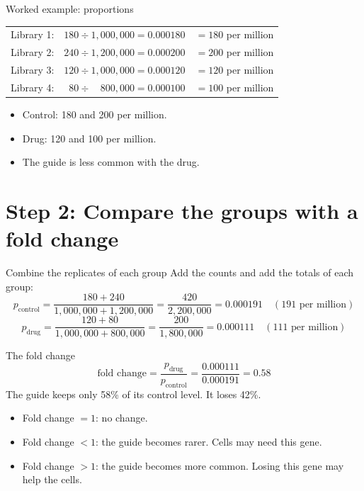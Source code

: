 \documentclass[aspectratio=169,11pt]{beamer}
\begin{document}
\begin{frame}{Worked example: proportions}
\begin{worked}[ 1]
\small
\begin{tabular}{@{}lll@{}}
Library 1: & $180 \div 1{,}000{,}000 = 0.000180$ & $= 180$ per million\\
Library 2: & $240 \div 1{,}200{,}000 = 0.000200$ & $= 200$ per million\\
Library 3: & $120 \div 1{,}000{,}000 = 0.000120$ & $= 120$ per million\\
Library 4: & $\phantom{0}80 \div \phantom{0,}800{,}000 = 0.000100$ & $= 100$ per million\\
\end{tabular}
\end{worked}
\begin{itemize}
\item Control: 180 and 200 per million.
\item Drug: 120 and 100 per million.
\item The guide is \alert{less common} with the drug.
\end{itemize}
\end{frame}

\section{Step 2: Compare the groups with a fold change}

\begin{frame}{Combine the replicates of each group}
Add the counts and add the totals of each group:
\[
p_{\text{control}} = \frac{180+240}{1{,}000{,}000+1{,}200{,}000}
 = \frac{420}{2{,}200{,}000} = 0.000191 \quad (191 \text{ per million})
\]
\[
p_{\text{drug}} = \frac{120+80}{1{,}000{,}000+800{,}000}
 = \frac{200}{1{,}800{,}000} = 0.000111 \quad (111 \text{ per million})
\]
\end{frame}

\begin{frame}{The fold change}
\[
\text{fold change} = \frac{p_{\text{drug}}}{p_{\text{control}}}
 = \frac{0.000111}{0.000191} = 0.58
\]
The guide keeps only 58\% of its control level. It loses 42\%.
\medskip
\begin{remember}
\begin{itemize}
\item Fold change $= 1$: no change.
\item Fold change $< 1$: the guide becomes rarer. Cells may need this gene.
\item Fold change $> 1$: the guide becomes more common. Losing this gene may
  help the cells.
\end{itemize}
\end{remember}
\end{frame}
\end{document}
